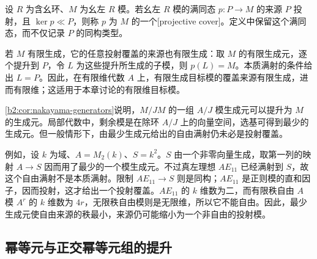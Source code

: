 \begin{definition}\label{b2:def:projective-cover}
	设 \(R\) 为含幺环、\(M\) 为幺左 \(R\) 模。若幺左 \(R\) 模的满同态 \(p:P\to M\) 的来源 \(P\) 投射，且 \(\ker p\ll P\)，则称 \(p\) 为 \(M\) 的一个[projective cover]。定义中保留这个满同态，而不仅记录 \(P\) 的同构类型。
\end{definition}

若 \(M\) 有限生成，它的任意投射覆盖的来源也有限生成：取 \(M\) 的有限生成元，逐个提升到 \(P\)，令 \(L\) 为这些提升所生成的子模，则 \(p(L)=M\)。本质满射的条件给出 \(L=P\)。因此，在有限维代数 \(A\) 上，有限生成目标模的覆盖来源有限生成，进而有限维；这适用于本章讨论的有限维目标模。

\ProseParagraphBreak
\cref{b2:cor:nakayama-generators}说明，\(M/JM\) 的一组 \(A/J\) 模生成元可以提升为 \(M\) 的生成元。局部代数中，剩余模是在除环 \(A/J\) 上的向量空间，选基可得到最少的生成元。但一般情形下，由最少生成元给出的自由满射仍未必是投射覆盖。

\ProseParagraphBreak
例如，设 \(k\) 为域、\(A=M_2(k)\)、\(S=k^2\)。\(S\) 由一个非零向量生成，取第一列的映射 \(A\to S\) 因而用了最少的一个模生成元。不过真左理想 \(AE_{11}\) 已经满射到 \(S\)，故这个自由满射不是本质满射。限制 \(AE_{11}\to S\) 则是同构；\(AE_{11}\) 是正则模的直和因子，因而投射，这才给出一个投射覆盖。\(AE_{11}\) 的 \(k\) 维数为二，而有限秩自由 \(A\) 模 \(A^r\) 的 \(k\) 维数为 \(4r\)，无限秩自由模则是无限维，所以它不能自由。因此，最少生成元使自由来源的秩最小，来源仍可能缩小为一个非自由的投射模。

\subsection{幂等元与正交幂等元组的提升}
\label{b2:subsec:1503:02}

